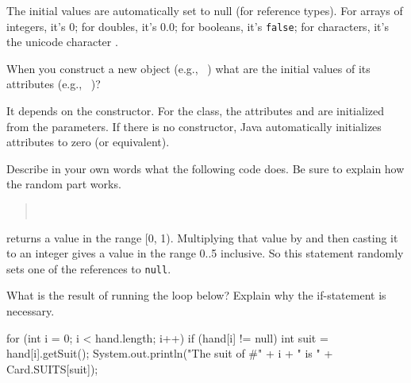 \begin{answer}
The initial values are automatically set to null (for reference types). For arrays of integers, it's 0; for doubles, it's 0.0; for booleans, it's {\tt false}; for characters, it's the unicode character .
\end{answer}


\Q When you construct a new object (e.g., ~) what are the initial values of its attributes (e.g., ~)?

\begin{answer}
It depends on the constructor. For the  class, the attributes  and  are initialized from the parameters. If there is no constructor, Java automatically initializes attributes to zero (or equivalent).
\end{answer}




\Q \label{random}
Describe in your own words what the following code does.
Be sure to explain how the random part works.

\begin{quote}
 \\
\end{quote}

\begin{answer}
 returns a value in the range [0, 1).
Multiplying that value by  and then casting it to an integer gives a value in the range 0..5 inclusive.
So this statement randomly sets one of the  references to {\tt null}.
\end{answer}


\Q \label{forcard}
What is the result of running the loop below?
Explain why the if-statement is necessary.

\begin{javalst}
for (int i = 0; i < hand.length; i++) {
    if (hand[i] != null) {
        int suit = hand[i].getSuit();
        System.out.println("The suit of #" + i + " is " + Card.SUITS[suit]);
    }
}
\end{javalst}

